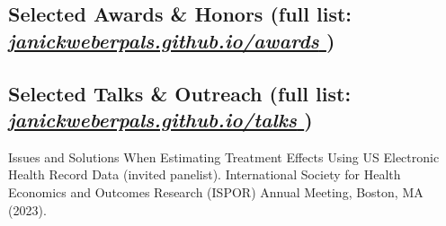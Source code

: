 \documentclass[letterpaper]{twentysecondcv} %
\begin{document}


\subsection{Selected Awards \& Honors \small(full list: \href{https://janickweberpals.github.io/awards}{\textit{janickweberpals.github.io/awards \ExternalLink}})}

\begin{twentyshort} %
\end{twentyshort}


\subsection{Selected Talks \& Outreach \small(full list: \href{https://janickweberpals.github.io/talks}{\textit{janickweberpals.github.io/talks \ExternalLink}})}

Issues and Solutions When Estimating Treatment Effects Using US Electronic Health Record Data (invited panelist). International Society for Health Economics and Outcomes Research (ISPOR) Annual Meeting, Boston, MA (2023). \href{https://www.ispor.org/conferences-education/conferences/upcoming-conferences/ispor-2023/program/program/paper/intl2023-3720/15893/316-closing-plenary-issues-and-solutions-when-estimating-treatment-effects-using-us-electronic-health-record-data}{\ExternalLink}
\end{document}
